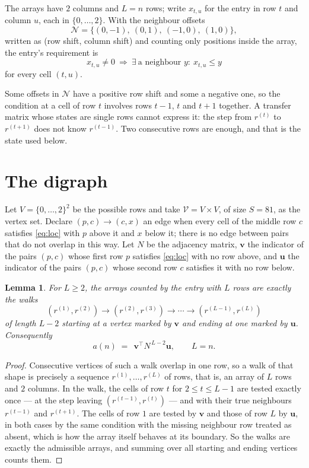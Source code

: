 \documentclass[11pt,a4paper]{article}
\theoremstyle{plain}
\newtheorem{lemma}[theorem]{Lemma}
\theoremstyle{definition}
\begin{document}
The arrays have $2$ columns and $L=n$ rows; write $x_{t,u}$ for the entry in
row $t$ and column $u$, each in $\{0,\dots,2\}$. With the neighbour offsets
\[
\mathcal N=\{(0,-1),\ (0,1),\ (-1,0),\ (1,0)\},
\]
written as (row shift, column shift) and counting only positions inside the array, the
entry's requirement is
\begin{equation}\label{eq:loc}
x_{t,u}\ne0\ \Rightarrow\ \exists\ \text{a neighbour }y:\ x_{t,u}\le y
\end{equation}
for every cell $(t,u)$.

Some offsets in $\mathcal N$ have a positive row shift and some a negative one, so the
condition at a cell of row $t$ involves rows $t-1$, $t$ and $t+1$ together. A transfer
matrix whose states are single rows cannot express it: the step from $r^{(t)}$ to
$r^{(t+1)}$ does not know $r^{(t-1)}$. Two consecutive rows are enough, and that is
the state used below.

\section{The digraph}

Let $V=\{0,\dots,2\}^{2}$ be the possible rows and take
$\mathcal V=V\times V$, of size $S=81$, as the vertex set. Declare $(p,c)\to(c,x)$ an edge
when every cell of the middle row $c$ satisfies \eqref{eq:loc} with $p$ above it and $x$
below it; there is no edge between pairs that do not overlap in this way. Let $N$ be the
adjacency matrix, $\mathbf{v}$ the indicator of the pairs $(p,c)$ whose first row $p$
satisfies \eqref{eq:loc} with no row above, and $\mathbf{u}$ the indicator of
the pairs $(p,c)$ whose second row $c$ satisfies it with no row below.

\begin{lemma}\label{lem:walk}
For $L\ge2$, the arrays counted by the entry with $L$ rows are exactly the walks
\[
(r^{(1)},r^{(2)})\to(r^{(2)},r^{(3)})\to\cdots\to(r^{(L-1)},r^{(L)})
\]
of length $L-2$ starting at a vertex marked by $\mathbf{v}$ and ending at one marked by
$\mathbf{u}$. Consequently
\[
a(n)\;=\;\,\mathbf{v}^{\!\top}N^{\,L-2}\mathbf{u},\qquad L=n .
\]
\end{lemma}

\begin{proof}
Consecutive vertices of such a walk overlap in one row, so a walk of that shape is
precisely a sequence $r^{(1)},\dots,r^{(L)}$ of rows, that is, an array of $L$ rows
and $2$ columns. In the walk, the cells of row $t$ for $2\le t\le L-1$ are tested
exactly once --- at the step leaving $(r^{(t-1)},r^{(t)})$ --- and with their true
neighbours $r^{(t-1)}$ and $r^{(t+1)}$. The cells of row $1$ are tested by
$\mathbf{v}$ and those of row $L$ by $\mathbf{u}$, in both cases by the same condition
with the missing neighbour row treated as absent, which is how the array itself behaves at
its boundary. So the walks are exactly the admissible arrays, and summing over all starting
and ending vertices counts them.
\end{proof}
\end{document}
